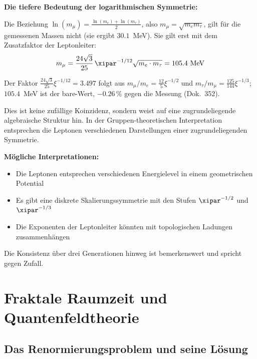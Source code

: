 	\begin{abhandlung}
		\textbf{Die tiefere Bedeutung der logarithmischen Symmetrie:}
		
		Die Beziehung $\ln(m_\mu) = \frac{\ln(m_e) + \ln(m_\tau)}{2}$, also $m_\mu = \sqrt{m_e m_\tau}$, gilt für die gemessenen Massen nicht (sie ergibt $30.1$~MeV). Sie gilt erst mit dem Zusatzfaktor der Leptonleiter:
		\begin{equation}
			m_\mu = \frac{24\sqrt{3}}{25}\,\xipar^{-1/12}\sqrt{m_e \cdot m_\tau} = 105.4\ \text{MeV}
		\end{equation}

		Der Faktor $\frac{24\sqrt3}{25}\xi^{-1/12} = 3.497$ folgt aus $m_\mu/m_e = \frac{12}{5}\xi^{-1/2}$ und $m_\tau/m_\mu = \frac{125}{144}\xi^{-1/3}$; $105.4$~MeV ist der bare-Wert, $-0.26\,\%$ gegen die Messung (Dok.~352).
		
		Dies ist keine zufällige Koinzidenz, sondern weist auf eine zugrundeliegende algebraische Struktur hin. In der Gruppen-theoretischen Interpretation entsprechen die Leptonen verschiedenen Darstellungen einer zugrundeliegenden Symmetrie.
		
		\textbf{Mögliche Interpretationen:}
		\begin{itemize}
			\item Die Leptonen entsprechen verschiedenen Energielevel in einem geometrischen Potential
			\item Es gibt eine diskrete Skalierungssymmetrie mit den Stufen $\xipar^{-1/2}$ und $\xipar^{-1/3}$
			\item Die Exponenten der Leptonleiter könnten mit topologischen Ladungen zusammenhängen
		\end{itemize}
		
		Die Konsistenz über drei Generationen hinweg ist bemerkenswert und spricht gegen Zufall.
	\end{abhandlung}
	
	\section{Fraktale Raumzeit und Quantenfeldtheorie}
	
	\subsection{Das Renormierungsproblem und seine Lösung}
	
